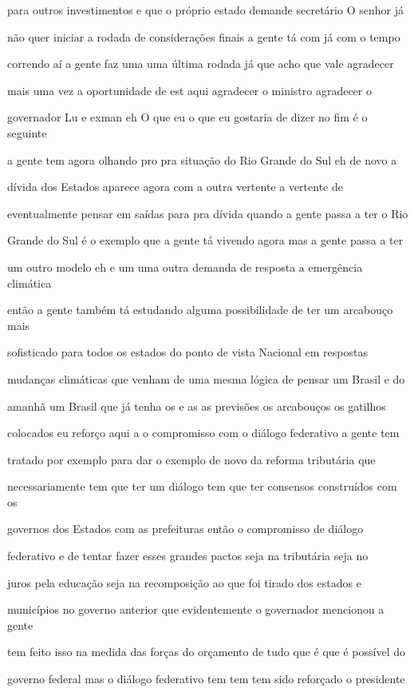 \documentclass[a4paper,12pt]{article}
\begin{document}
para outros investimentos e que o próprio estado demande secretário O senhor já

não quer iniciar a rodada de considerações finais a gente tá com já com o tempo

correndo aí a gente faz uma uma última rodada já que acho que vale agradecer

mais uma vez a oportunidade de est aqui agradecer o ministro agradecer o

governador Lu e exman eh O que eu o que eu gostaria de dizer no fim é o seguinte

a gente tem agora olhando pro pra situação do Rio Grande do Sul eh de novo a

dívida dos Estados aparece agora com a outra vertente a vertente de

eventualmente pensar em saídas para pra dívida quando a gente passa a ter o Rio

Grande do Sul é o exemplo que a gente tá vivendo agora mas a gente passa a ter

um outro modelo eh e um uma outra demanda de resposta a emergência climática

então a gente também tá estudando alguma possibilidade de ter um arcabouço mais

sofisticado para todos os estados do ponto de vista Nacional em respostas

mudanças climáticas que venham de uma mesma lógica de pensar um Brasil e do

amanhã um Brasil que já tenha os e as as previsões os arcabouços os gatilhos

colocados eu reforço aqui a o compromisso com o diálogo federativo a gente tem

tratado por exemplo para dar o exemplo de novo da reforma tributária que

necessariamente tem que ter um diálogo tem que ter consensos construídos com os

governos dos Estados com as prefeituras então o compromisso de diálogo

federativo e de tentar fazer esses grandes pactos seja na tributária seja no

juros pela educação seja na recomposição ao que foi tirado dos estados e

municípios no governo anterior que evidentemente o governador mencionou a gente

tem feito isso na medida das forças do orçamento de tudo que é que é possível do

governo federal mas o diálogo federativo tem tem tem sido reforçado o presidente
\end{document}
